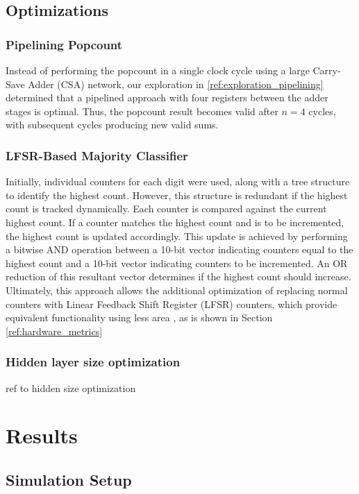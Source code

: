 \documentclass[conference]{IEEEtran}
\begin{document}
\subsection{Optimizations}
\subsubsection{Pipelining Popcount}
\label{ref:pipeline_popcount}

Instead of performing the popcount in a single clock cycle using a large Carry-Save Adder (CSA) network, our exploration in \autoref{ref:exploration_pipelining} determined that a pipelined approach with four registers between the adder stages is optimal. Thus, the popcount result becomes valid after $n=4$ cycles, with subsequent cycles producing new valid sums.

\subsubsection{LFSR-Based Majority Classifier}
\label{ref:lfsr_opt}

Initially, individual counters for each digit were used, along with a tree structure to identify the highest count. However, this structure is redundant if the highest count is tracked dynamically. Each counter is compared against the current highest count. If a counter matches the highest count and is to be incremented, the highest count is updated accordingly. This update is achieved by performing a bitwise AND operation between a 10-bit vector indicating counters equal to the highest count and a 10-bit vector indicating counters to be incremented. An OR reduction of this resultant vector determines if the highest count should increase. 
Ultimately, this approach allows the additional optimization of replacing normal counters with Linear Feedback Shift Register (LFSR) counters, which provide equivalent functionality using less area \cite{xilinx_lfsr}, as is shown in Section \ref{ref:hardware_metrics}

\subsubsection{Hidden layer size optimization}
ref to hidden size optimization 


\section{Results}
\label{sec:results}
\subsection{Simulation Setup}
\end{document}
